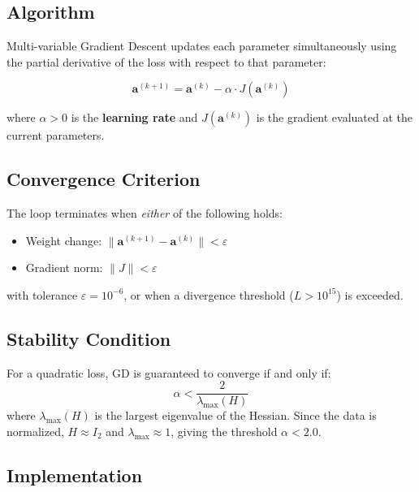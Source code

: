 \documentclass[12pt,a4paper]{article}
\begin{document}
\subsection{Algorithm}

Multi-variable Gradient Descent updates each parameter simultaneously using the
partial derivative of the loss with respect to that parameter:

\begin{equation}
    \mathbf{a}^{(k+1)} = \mathbf{a}^{(k)} - \alpha \cdot J\!\left(\mathbf{a}^{(k)}\right)
\end{equation}

where \(\alpha > 0\) is the \textbf{learning rate} and \(J(\mathbf{a}^{(k)})\) is the
gradient evaluated at the current parameters.

\subsection{Convergence Criterion}

The loop terminates when \textit{either} of the following holds:
\begin{itemize}[noitemsep]
    \item Weight change: $\|\mathbf{a}^{(k+1)} - \mathbf{a}^{(k)}\| < \varepsilon$
    \item Gradient norm: $\|J\| < \varepsilon$
\end{itemize}
with tolerance $\varepsilon = 10^{-6}$, or when a divergence threshold
($L > 10^{15}$) is exceeded.

\subsection{Stability Condition}

For a quadratic loss, GD is guaranteed to converge if and only if:
\begin{equation}
    \alpha < \frac{2}{\lambda_{\max}(H)}
\end{equation}
where $\lambda_{\max}(H)$ is the largest eigenvalue of the Hessian. Since the data is
normalized, $H \approx I_2$ and $\lambda_{\max} \approx 1$, giving the threshold
$\alpha < 2.0$.

\subsection{Implementation}
\end{document}
